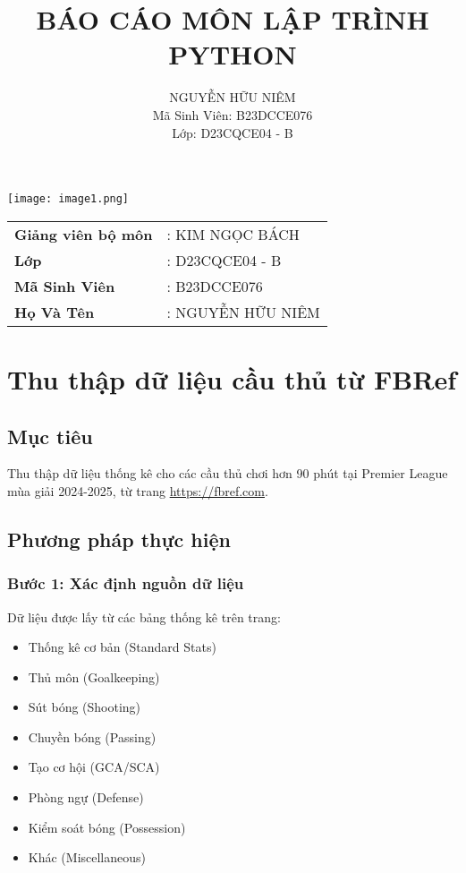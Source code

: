 \documentclass[12pt,a4paper]{article}
\title{BÁO CÁO MÔN LẬP TRÌNH PYTHON}
\author{NGUYỄN HỮU NIÊM \\ Mã Sinh Viên: B23DCCE076 \\ Lớp: D23CQCE04 - B}
\date{}
\begin{document}
\maketitle

\begin{center}
\texttt{[image: image1.png]}
\end{center}

\begin{tabular}{ll}
\textbf{Giảng viên bộ môn} & : KIM NGỌC BÁCH \\
\textbf{Lớp} & : D23CQCE04 - B \\
\textbf{Mã Sinh Viên} & : B23DCCE076 \\
\textbf{Họ Và Tên} & : NGUYỄN HỮU NIÊM \\
\end{tabular}

\newpage

\tableofcontents

\newpage

\section{Thu thập dữ liệu cầu thủ từ FBRef}

\subsection{Mục tiêu}
Thu thập dữ liệu thống kê cho các cầu thủ chơi hơn 90 phút tại Premier League mùa giải 2024-2025, từ trang \url{https://fbref.com}.

\subsection{Phương pháp thực hiện}

\subsubsection{Bước 1: Xác định nguồn dữ liệu}
Dữ liệu được lấy từ các bảng thống kê trên trang:
\begin{itemize}
\item Thống kê cơ bản (Standard Stats)
\item Thủ môn (Goalkeeping)
\item Sút bóng (Shooting)
\item Chuyền bóng (Passing)
\item Tạo cơ hội (GCA/SCA)
\item Phòng ngự (Defense)
\item Kiểm soát bóng (Possession)
\item Khác (Miscellaneous)
\end{itemize}
\end{document}
